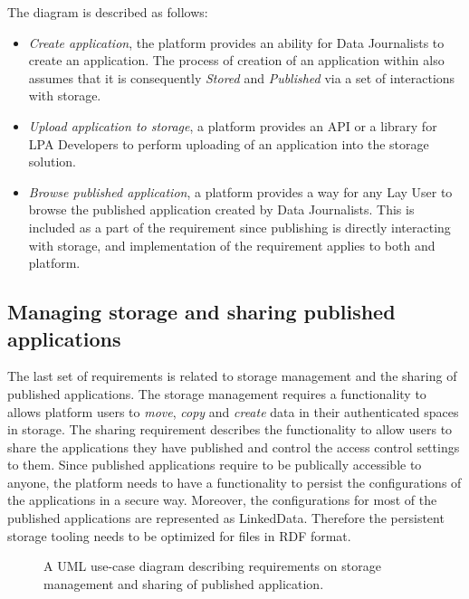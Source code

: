 The diagram is described as follows:
\begin{itemize}
    \item \textit{Create application}, the platform provides an ability for Data Journalists to create an application. The process of creation of an application within \lpa{} also assumes that it is consequently \textit{Stored} and \textit{Published} via a set of interactions with storage.
    \item \textit{Upload application to storage}, a platform provides an API or a library for LPA Developers to perform uploading of an application into the storage solution.
    \item \textit{Browse published application}, a platform provides a way for any Lay User to browse the published application created by Data Journalists. This is included as a part of the requirement since publishing is directly interacting with storage, and implementation of the requirement applies to both \lpas{} and \lpa{} platform.
\end{itemize}


\subsection{Managing storage and sharing published applications}

The last set of requirements is related to storage management and the sharing of published applications. The storage management requires a functionality to allows platform users to \textit{move}, \textit{copy} and \textit{create} data in their authenticated spaces in storage. The sharing requirement describes the functionality to allow users to share the applications they have published and control the access control settings to them. Since published applications require to be publically accessible to anyone, the platform needs to have a functionality to persist the configurations of the applications in a secure way. Moreover, the configurations for most of the published applications are represented as LinkedData. Therefore the persistent storage tooling needs to be optimized for files in RDF format.
 
\begin{figure}[h]
\centering
{}
\caption{A UML use-case diagram describing requirements on storage management and sharing of published application.}
\label{fig:lpa_managing_storage}
\end{figure}

